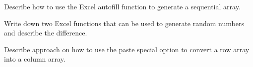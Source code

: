 \begin{exercise}
  Describe how to use the Excel autofill function to generate a sequential array.
\end{exercise}
\vspace*{3\baselineskip}

\begin{exercise}
  Write down two Excel functions that can be used to generate random numbers and describe the difference.
\end{exercise}
\vspace*{3\baselineskip}

\begin{exercise}
  Describe approach on how to use the paste special option to convert a row array into a column array.
\end{exercise}

